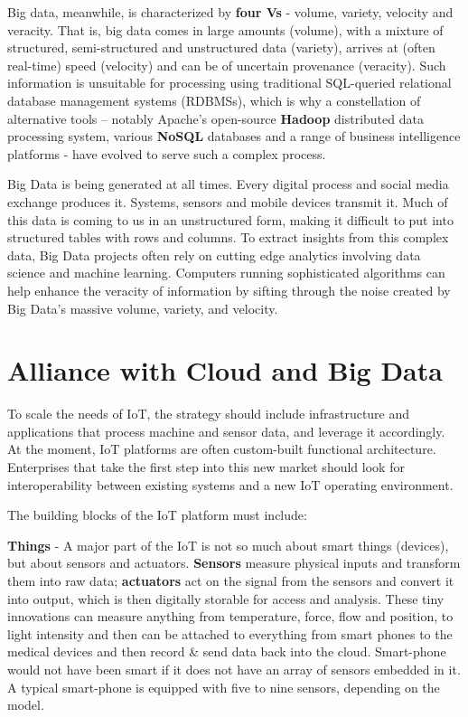 \documentclass[sigconf]{acmart}
\begin{document}
Big data, meanwhile, is characterized by \textbf{four Vs} - volume, variety, velocity and veracity\cite{wiki_bigdata}. That is, big data comes in large amounts (volume), with a mixture of structured, semi-structured and unstructured data (variety), arrives at (often real-time) speed (velocity) and can be of uncertain provenance (veracity). Such information is unsuitable for processing using traditional SQL-queried relational database management systems (RDBMSs), which is why a constellation of alternative tools -- notably Apache's open-source \textbf{Hadoop} distributed data processing system, various \textbf{NoSQL} databases and a range of business intelligence platforms - have evolved to serve such a complex process.

Big Data is being generated at all times. Every digital process and social media exchange produces it. Systems, sensors and mobile devices transmit it. Much of this data is coming to us in an unstructured form, making it difficult to put into structured tables with rows and columns. To extract insights from this complex data, Big Data projects often rely on cutting edge analytics involving data science and machine learning. Computers running sophisticated algorithms can help enhance the veracity of information by sifting through the noise created by Big Data's massive volume, variety, and velocity.

\section{Alliance with Cloud and Big Data}

To scale the needs of IoT, the strategy should include infrastructure and applications that process machine and sensor data, and leverage it accordingly. At the moment, IoT platforms are often custom-built functional architecture. Enterprises that take the first step into this new market should look for interoperability between existing systems and a new IoT operating environment.

The building blocks of the IoT platform must include:

\textbf{Things} -  A major part of the IoT is not so much about smart things (devices), but about sensors and actuators. \textbf{Sensors} measure physical inputs and transform them into raw data; \textbf{actuators} act on the signal from the sensors and convert it into output, which is then digitally storable for access and analysis.  These tiny innovations can measure anything from temperature, force, flow and position, to light intensity and then can be attached to everything from smart phones to the medical devices and then record \& send data back into the cloud. Smart-phone would not have been smart if it does not have an array of sensors embedded in it\cite{Wiley_Book}.  A typical smart-phone is equipped with five to nine sensors, depending on the model. 
\end{document}
